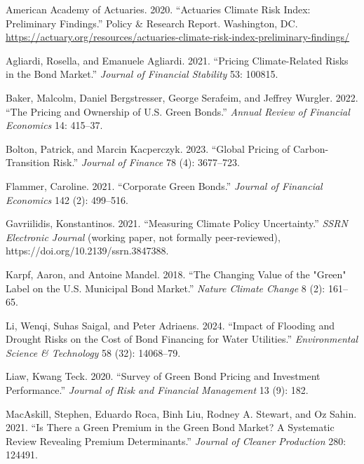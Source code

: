 \documentclass[
  11pt,
]{article}
\newlength{\cslhangindent}
\newenvironment{CSLReferences}[2] %
 {\begin{list}{}{%
  \setlength{\itemindent}{0pt}
  \setlength{\leftmargin}{0pt}
  \setlength{\parsep}{0pt}
  \ifodd #1
   \setlength{\leftmargin}{\cslhangindent}
   \setlength{\itemindent}{-1\cslhangindent}
  \fi
  \setlength{\itemsep}{#2\baselineskip}}}
 {\end{list}}
\begin{document}
\protect{}\label{refs}
\begin{CSLReferences}{1}{1}
American Academy of Actuaries. 2020. {``Actuaries Climate Risk Index:
Preliminary Findings.''} Policy \& Research Report. Washington, DC.
\url{https://actuary.org/resources/actuaries-climate-risk-index-preliminary-findings/}

Agliardi, Rosella, and Emanuele Agliardi. 2021. {``Pricing
Climate-Related Risks in the Bond Market.''} \emph{Journal of Financial
Stability} 53: 100815.

Baker, Malcolm, Daniel Bergstresser, George Serafeim, and Jeffrey
Wurgler. 2022. {``The Pricing and Ownership of U.S. Green Bonds.''}
\emph{Annual Review of Financial Economics} 14: 415--37.

Bolton, Patrick, and Marcin Kacperczyk. 2023. {``Global Pricing of
Carbon-Transition Risk.''} \emph{Journal of Finance} 78 (4): 3677--723.

Flammer, Caroline. 2021. {``Corporate Green Bonds.''} \emph{Journal of
Financial Economics} 142 (2): 499--516.

Gavriilidis, Konstantinos. 2021. {``Measuring Climate Policy
Uncertainty.''} \emph{SSRN Electronic Journal} (working paper, not formally peer-reviewed), https://doi.org/10.2139/ssrn.3847388.

Karpf, Aaron, and Antoine Mandel. 2018. {``The Changing Value of the
"Green" Label on the U.S. Municipal Bond Market.''} \emph{Nature Climate
Change} 8 (2): 161--65.

Li, Wenqi, Suhas Saigal, and Peter Adriaens. 2024. {``Impact of Flooding
and Drought Risks on the Cost of Bond Financing for Water Utilities.''}
\emph{Environmental Science \& Technology} 58 (32): 14068--79.

Liaw, Kwang Teck. 2020. {``Survey of Green Bond Pricing and Investment
Performance.''} \emph{Journal of Risk and Financial Management} 13 (9):
182.

MacAskill, Stephen, Eduardo Roca, Binh Liu, Rodney A. Stewart, and Oz
Sahin. 2021. {``Is There a Green Premium in the Green Bond Market? A
Systematic Review Revealing Premium Determinants.''} \emph{Journal of
Cleaner Production} 280: 124491.


\end{CSLReferences}
\end{document}
